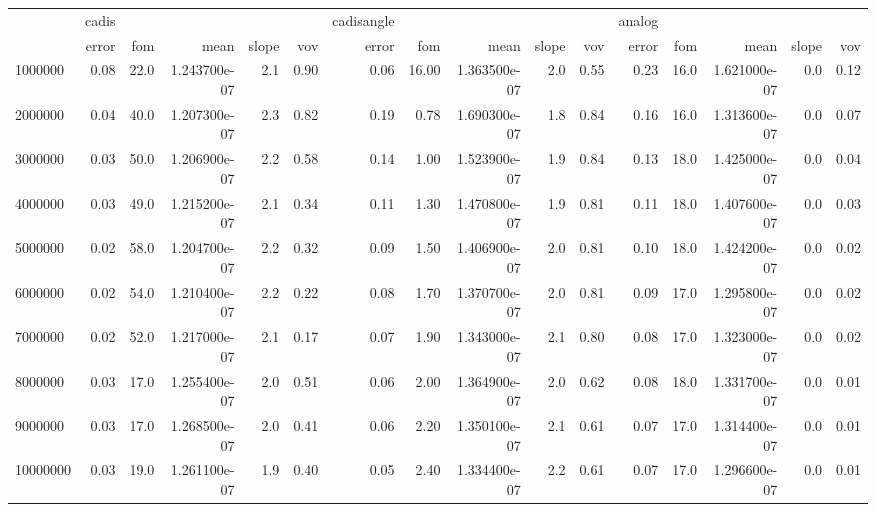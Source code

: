 \begin{tabular}{lrrrrrrrrrrrrrrr}
\toprule
{} & cadis &      &               &       &      & cadisangle &       &               &       &      & analog &      &               &       &      \\
{} & error &  fom &          mean & slope &  vov &      error &   fom &          mean & slope &  vov &  error &  fom &          mean & slope &  vov \\
\midrule
1000000  &  0.08 & 22.0 &  1.243700e-07 &   2.1 & 0.90 &       0.06 & 16.00 &  1.363500e-07 &   2.0 & 0.55 &   0.23 & 16.0 &  1.621000e-07 &   0.0 & 0.12 \\
2000000  &  0.04 & 40.0 &  1.207300e-07 &   2.3 & 0.82 &       0.19 &  0.78 &  1.690300e-07 &   1.8 & 0.84 &   0.16 & 16.0 &  1.313600e-07 &   0.0 & 0.07 \\
3000000  &  0.03 & 50.0 &  1.206900e-07 &   2.2 & 0.58 &       0.14 &  1.00 &  1.523900e-07 &   1.9 & 0.84 &   0.13 & 18.0 &  1.425000e-07 &   0.0 & 0.04 \\
4000000  &  0.03 & 49.0 &  1.215200e-07 &   2.1 & 0.34 &       0.11 &  1.30 &  1.470800e-07 &   1.9 & 0.81 &   0.11 & 18.0 &  1.407600e-07 &   0.0 & 0.03 \\
5000000  &  0.02 & 58.0 &  1.204700e-07 &   2.2 & 0.32 &       0.09 &  1.50 &  1.406900e-07 &   2.0 & 0.81 &   0.10 & 18.0 &  1.424200e-07 &   0.0 & 0.02 \\
6000000  &  0.02 & 54.0 &  1.210400e-07 &   2.2 & 0.22 &       0.08 &  1.70 &  1.370700e-07 &   2.0 & 0.81 &   0.09 & 17.0 &  1.295800e-07 &   0.0 & 0.02 \\
7000000  &  0.02 & 52.0 &  1.217000e-07 &   2.1 & 0.17 &       0.07 &  1.90 &  1.343000e-07 &   2.1 & 0.80 &   0.08 & 17.0 &  1.323000e-07 &   0.0 & 0.02 \\
8000000  &  0.03 & 17.0 &  1.255400e-07 &   2.0 & 0.51 &       0.06 &  2.00 &  1.364900e-07 &   2.0 & 0.62 &   0.08 & 18.0 &  1.331700e-07 &   0.0 & 0.01 \\
9000000  &  0.03 & 17.0 &  1.268500e-07 &   2.0 & 0.41 &       0.06 &  2.20 &  1.350100e-07 &   2.1 & 0.61 &   0.07 & 17.0 &  1.314400e-07 &   0.0 & 0.01 \\
10000000 &  0.03 & 19.0 &  1.261100e-07 &   1.9 & 0.40 &       0.05 &  2.40 &  1.334400e-07 &   2.2 & 0.61 &   0.07 & 17.0 &  1.296600e-07 &   0.0 & 0.01 \\
\bottomrule
\end{tabular}
